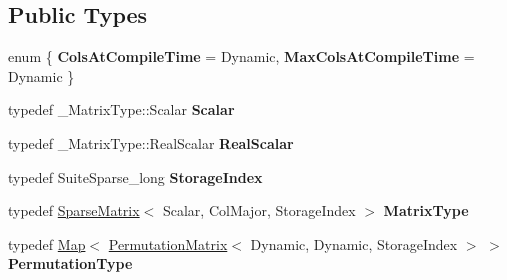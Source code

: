 \subsection*{Public Types}
\begin{DoxyCompactItemize}
\item 
\mbox{\label{class_eigen_1_1_s_p_q_r_a1b8cb657267492e84c9f53dc140fd092}} 
enum \{ {\bfseries Cols\+At\+Compile\+Time} = Dynamic, 
{\bfseries Max\+Cols\+At\+Compile\+Time} = Dynamic
 \}
\item 
\mbox{\label{class_eigen_1_1_s_p_q_r_a79aab4f4c7b3560c35ff3964e2831168}} 
typedef \+\_\+\+Matrix\+Type\+::\+Scalar {\bfseries Scalar}
\item 
\mbox{\label{class_eigen_1_1_s_p_q_r_aa0433fd3ee69389de7546a1daf40db04}} 
typedef \+\_\+\+Matrix\+Type\+::\+Real\+Scalar {\bfseries Real\+Scalar}
\item 
\mbox{\label{class_eigen_1_1_s_p_q_r_a7154a96ee31df16cc511f275a5b02d27}} 
typedef Suite\+Sparse\+\_\+long {\bfseries Storage\+Index}
\item 
\mbox{\label{class_eigen_1_1_s_p_q_r_ab91804223761e179d79bd3a1aa7c4111}} 
typedef \mbox{\hyperlink{class_eigen_1_1_sparse_matrix}{Sparse\+Matrix}}$<$ Scalar, Col\+Major, Storage\+Index $>$ {\bfseries Matrix\+Type}
\item 
\mbox{\label{class_eigen_1_1_s_p_q_r_aa74de4635fdaee8773d8b320b564db5f}} 
typedef \mbox{\hyperlink{class_eigen_1_1_map}{Map}}$<$ \mbox{\hyperlink{class_eigen_1_1_permutation_matrix}{Permutation\+Matrix}}$<$ Dynamic, Dynamic, Storage\+Index $>$ $>$ {\bfseries Permutation\+Type}
\end{DoxyCompactItemize}
